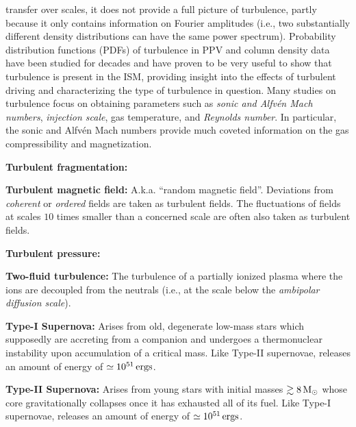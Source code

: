 \documentclass[a4paper,10pt]{article}
\begin{document}
transfer over scales, it does not provide a full picture of turbulence, partly because it only contains information on Fourier amplitudes (i.e., two substantially different density distributions can have the same power spectrum). Probability distribution functions (PDFs) of turbulence in PPV and column density data have been studied for decades and have proven to be very useful to show that turbulence is present in the ISM, providing insight into the effects of turbulent driving and characterizing the type of turbulence in question. Many studies on turbulence focus on obtaining parameters such as \textit{sonic and Alfv\'en Mach numbers}, \textit{injection scale}, gas temperature, and \textit{Reynolds number}. In particular, the sonic and Alfv\'en Mach numbers provide much coveted information on the gas compressibility and magnetization.

{\noindent}\textbf{Turbulent fragmentation:}

{\noindent}\textbf{Turbulent magnetic field:} A.k.a. ``random magnetic field''. Deviations from \textit{coherent} or \textit{ordered} fields are taken as turbulent fields. The fluctuations of fields at scales $10$ times smaller than a concerned scale are often also taken as turbulent fields.

{\noindent}\textbf{Turbulent pressure:}

{\noindent}\textbf{Two-fluid turbulence:} The turbulence of a partially ionized plasma where the ions are decoupled from the neutrals (i.e., at the scale below the \textit{ambipolar diffusion scale}).

{\noindent}\textbf{Type-I Supernova:} Arises from old, degenerate low-mass stars which supposedly are accreting from a companion and undergoes a thermonuclear instability upon accumulation of a critical mass. Like Type-II supernovae, releases an amount of energy of $\simeq10^{51}\,{\rm ergs}$.

{\noindent}\textbf{Type-II Supernova:} Arises from young stars with initial masses $\gtrsim8\,{\rm M}_\odot$ whose core gravitationally collapses once it has exhausted all of its fuel. Like Type-I supernovae, releases an amount of energy of $\simeq10^{51}\,{\rm ergs}$.
\end{document}
